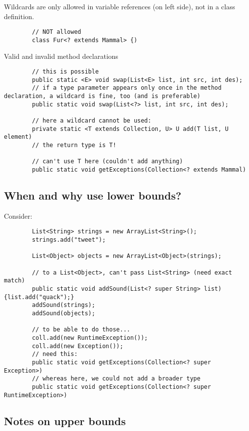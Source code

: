 \documentclass{scrartcl}
\begin{document}
     Wildcards are only allowed in variable references (on left side), not in a class definition.

    \begin{lstlisting}
        // NOT allowed
        class Fur<? extends Mammal> {)
    \end{lstlisting}

    Valid and invalid method declarations

    \begin{lstlisting}
        // this is possible
        public static <E> void swap(List<E> list, int src, int des);
        // if a type parameter appears only once in the method declaration, a wildcard is fine, too (and is preferable)
        public static void swap(List<?> list, int src, int des);

        // here a wildcard cannot be used:
        private static <T extends Collection, U> U add(T list, U element)
        // the return type is T!

        // can't use T here (couldn't add anything)
        public static void getExceptions(Collection<? extends Mammal)
    \end{lstlisting}

\subsection{When and why use lower bounds?}

    Consider:

    \begin{lstlisting}
        List<String> strings = new ArrayList<String>();
        strings.add("tweet");

        List<Object> objects = new ArrayList<Object>(strings);

        // to a List<Object>, can't pass List<String> (need exact match)
        public static void addSound(List<? super String> list) {list.add("quack");}
        addSound(strings);
        addSound(objects);

        // to be able to do those...
        coll.add(new RuntimeException());
        coll.add(new Exception());
        // need this:
        public static void getExceptions(Collection<? super Exception>)
        // whereas here, we could not add a broader type
        public static void getExceptions(Collection<? super RuntimeException>)

    \end{lstlisting}

\subsection{Notes on upper bounds}
\end{document}
